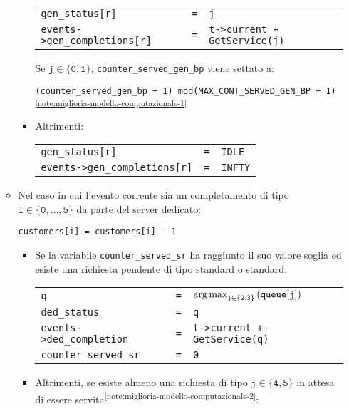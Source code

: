 \begin{enumerate}[label=Step \arabic*), align=left, leftmargin=*]
\begin{itemize}
\begin{itemize}
\begin{center}
\begin{tabular}{l l l}
\texttt{gen\_status[r]} & \texttt{=} & \texttt{j} \\
\texttt{events->gen\_completions[r]} & \texttt{=} & \texttt{t->current + GetService(j)}
\end{tabular}
\end{center}
{\color{purple}Se $\mathtt{j \in \lbrace 0, 1 \rbrace}$, \texttt{counter\_served\_gen\_bp} viene settato a:
\begin{center}
\texttt{(counter\_served\_gen\_bp + 1) mod(MAX\_CONT\_SERVED\_GEN\_BP + 1)}\textsuperscript{\ref{note:miglioria-modello-computazionale-1}}
\end{center}}
\item Altrimenti:
\begin{center}
\begin{tabular}{l l l}
\texttt{gen\_status[r]} & \texttt{=} & \texttt{IDLE} \\
\texttt{events->gen\_completions[r]} & \texttt{=} & \texttt{INFTY}
\end{tabular}
\end{center}
\end{itemize}
\item Nel caso in cui l'evento corrente sia un completamento di tipo $\mathtt{i \in \lbrace 0, \dots, 5 \rbrace}$ da parte del server dedicato:
\begin{center}
\texttt{customers[i] = customers[i] - 1}
\end{center}
\begin{itemize}
\item {\color{purple}Se la variabile \texttt{counter\_served\_sr} ha raggiunto il suo valore soglia ed esiste una richiesta pendente di tipo \uo{} standard o \pp{} standard:
\begin{center}
\begin{tabular}{l l l}
\texttt{q} & \texttt{=} & $\mathtt{\operatorname*{arg\,max}_{j \in \lbrace 2, 3 \rbrace}{\left(queue[j]\right)}}$ \\
\texttt{ded\_status} & \texttt{=} & \texttt{q} \\
\texttt{events->ded\_completion} & \texttt{=} & \texttt{t->current + GetService(q)} \\
\texttt{counter\_served\_sr} & \texttt{=} & \texttt{0}
\end{tabular}
\end{center}}
\item {\color{purple}Altrimenti,} se esiste almeno una richiesta di tipo $\mathtt{j \in \lbrace 4, 5 \rbrace}$ in attesa di essere servita\textsuperscript{\ref{note:miglioria-modello-computazionale-2}}:

\end{itemize}
\end{itemize}
\end{enumerate}
